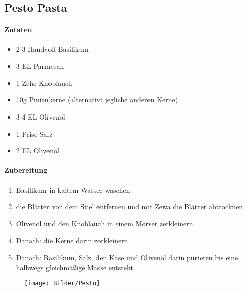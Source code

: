 \newpage
\subsection{Pesto Pasta}
\paragraph{Zutaten}
\begin{itemize}[noitemsep]
	\item 2-3 Handvoll Basilikum
	\item 3 EL Parmesan
	\item 1 Zehe Knoblauch 
	\item 10g Pinienkerne (alternativ: jegliche anderen Kerne)
	\item 3-4 EL Olivenöl 
	\item 1 Prise Salz
	\item 2 EL Olivenöl 
\end{itemize}
\paragraph{Zubereitung}
\begin{enumerate}[noitemsep]
	\item Basilikum in kaltem Wasser waschen
	\item die Blätter von dem Stiel entfernen und mit Zewa die Blätter abtrocknen
	\item Olivenöl und den Knoblauch in einem Mörser zerkleinern
	\item Danach: die Kerne darin zerkleinern 
	\item Danach: Basilikum, Salz, den Käse und Olivenöl darin pürieren bis eine halbwegs gleichmäßige Masse entsteht
\end{enumerate}
\vspace{1.5cm}
\begin{figure}[h]
\centering
\texttt{[image: Bilder/Pesto]}
\end{figure}